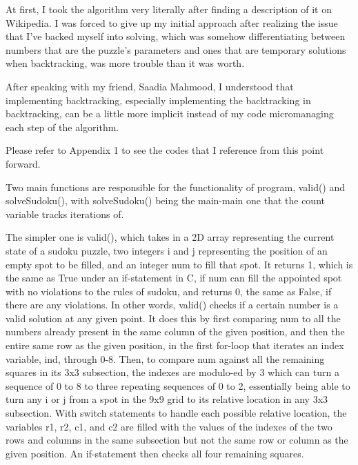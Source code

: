 \documentclass{article}
\begin{document}
At first, I took the algorithm very literally after finding a description of it on Wikipedia. I was forced to give up my initial approach after realizing the issue that I've backed myself into solving, which was somehow differentiating between numbers that are the puzzle's parameters and ones that are temporary solutions when backtracking, was more trouble than it was worth. 

After speaking with my friend, Saadia Mahmood, I understood that implementing backtracking, especially implementing the backtracking in backtracking, can be a little more implicit instead of my code micromanaging each step of the algorithm. 

Please refer to Appendix 1 to see the codes that I reference from this point forward. 

Two main functions are responsible for the functionality of program, valid() and solveSudoku(), with solveSudoku() being the main-main one that the count variable tracks iterations of. 

The simpler one is valid(), which takes in a 2D array representing the current state of a sudoku puzzle, two integers i and j representing the position of an empty spot to be filled, and an integer num to fill that spot. It returns 1, which is the same as True under an if-statement in C, if num can fill the appointed spot with no violations to the rules of sudoku, and returns 0, the same as False, if there are any violations. In other words, valid() checks if a certain number is a valid solution at any given point. It does this by first comparing num to all the numbers already present in the same column of the given position, and then the entire same row as the given position, in the first for-loop that iterates an index variable, ind, through 0-8. Then, to compare num against all the remaining squares in its 3x3 subsection, the indexes are modulo-ed by 3 which can turn a sequence of 0 to 8 to three repeating sequences of 0 to 2, essentially being able to turn any i or j from a spot in the 9x9 grid to its relative location in any 3x3 subsection. With switch statements to handle each possible relative location, the variables r1, r2, c1, and c2 are filled with the values of the indexes of the two rows and columns in the same subsection but not the same row or column as the given position. An if-statement then checks all four remaining squares. 
\end{document}
